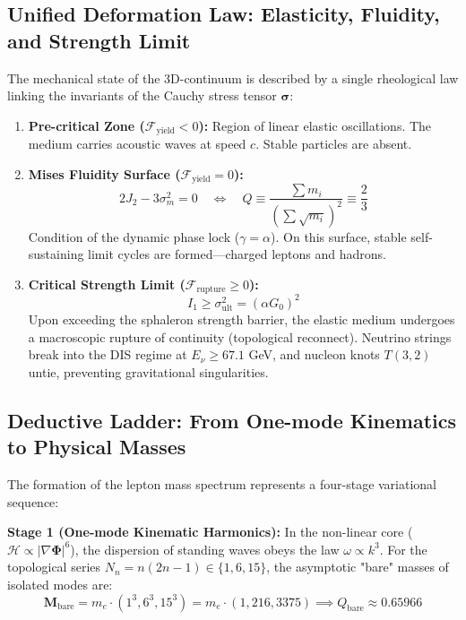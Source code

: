 \documentclass[12pt,a4paper]{article}
\begin{document}
	\subsection{Unified Deformation Law: Elasticity, Fluidity, and Strength Limit}
	The mechanical state of the 3D-continuum is described by a single rheological law linking the invariants of the Cauchy stress tensor $\boldsymbol{\sigma}$:
	\begin{enumerate}
		\item \textbf{Pre-critical Zone ($\mathcal{F}_{\mathrm{yield}} < 0$):} Region of linear elastic oscillations. The medium carries acoustic waves at speed $c$. Stable particles are absent.
		\item \textbf{Mises Fluidity Surface ($\mathcal{F}_{\mathrm{yield}} = 0$):} 
		\begin{equation}
			2 J_2 - 3 \sigma_m^2 = 0 \quad \Longleftrightarrow \quad Q \equiv \frac{\sum m_i}{\left(\sum \sqrt{m_i}\right)^2} \equiv \frac{2}{3}
		\end{equation}
		Condition of the dynamic phase lock ($\gamma = \alpha$). On this surface, stable self-sustaining limit cycles are formed—charged leptons and hadrons.
		\item \textbf{Critical Strength Limit ($\mathcal{F}_{\mathrm{rupture}} \ge 0$):}
		\begin{equation}
			I_1 \ge \sigma_{\mathrm{ult}}^2 = (\alpha G_0)^2
		\end{equation}
		Upon exceeding the sphaleron strength barrier, the elastic medium undergoes a macroscopic rupture of continuity (topological reconnect). Neutrino strings break into the DIS regime at $E_\nu \ge 67.1$ GeV, and nucleon knots $T(3,2)$ untie, preventing gravitational singularities.
	\end{enumerate}
	
	\subsection{Deductive Ladder: From One-mode Kinematics to Physical Masses}
	The formation of the lepton mass spectrum represents a four-stage variational sequence:
	
	\textbf{Stage 1 (One-mode Kinematic Harmonics):}
	In the non-linear core ($\mathcal{H} \propto |\nabla\boldsymbol{\Phi}|^6$), the dispersion of standing waves obeys the law $\omega \propto k^3$. For the topological series $N_n = n(2n-1) \in \{1, 6, 15\}$, the asymptotic "bare" masses of isolated modes are:
	\begin{equation}
		\mathbf{M}_{\mathrm{bare}} = m_e \cdot (1^3, 6^3, 15^3) = m_e \cdot (1, 216, 3375) \implies Q_{\mathrm{bare}} \approx 0.65966
	\end{equation}
	
\end{document}
